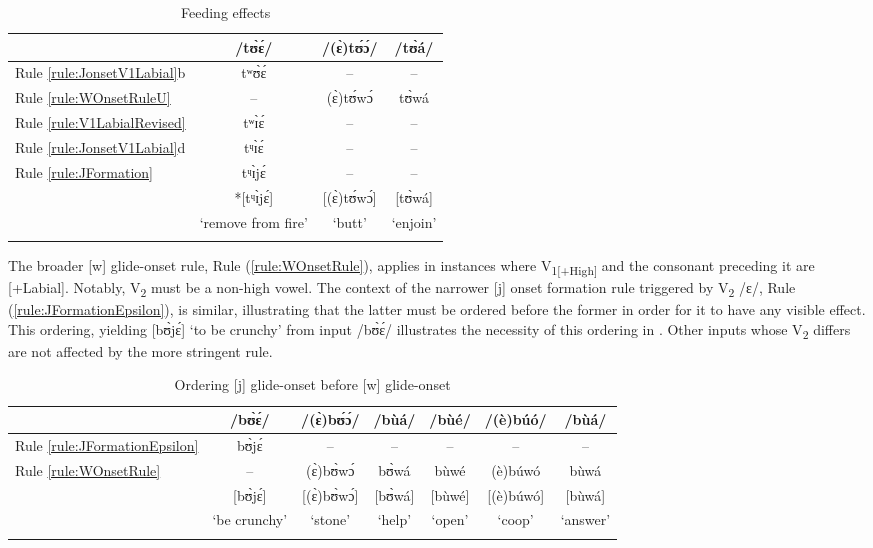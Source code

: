 \documentclass[output=paper,colorlinks,citecolor=brown]{langscibook}
\begin{document}
\begin{table}
\caption{Feeding effects}
\label{tab:Ordering4}
 \begin{tabular}{lccc}
  \lsptoprule
   & /tʊ̀ɛ́/	&/(ɛ̀)tʊ́ɔ́/&	/tʊ̀á/	\\
   \midrule
   Rule \ref{rule:JonsetV1Labial}b & tʷʊ̀ɛ́ & -- & -- \\
   Rule \ref{rule:WOnsetRuleU} & -- & (ɛ̀)tʊ́wɔ́ & tʊ̀wá\\
    Rule \ref{rule:V1LabialRevised} & tʷɪ̀ɛ́ & -- & -- \\
    Rule \ref{rule:JonsetV1Labial}d & tᶣɪ̀ɛ́ & -- &  -- \\
    Rule \ref{rule:JFormation} & tᶣɪ̀jɛ́ & -- & -- \\
    \midrule
   & *[tᶣɪ̀jɛ́] & [(ɛ̀)tʊ́wɔ́] & [tʊ̀wá] \\
   & `remove from fire' & `butt' & `enjoin' \\
  \lspbottomrule
 \end{tabular}
 \end{table}

The broader [w] glide-onset rule, Rule (\ref{rule:WOnsetRule}), applies in instances where V\textsubscript{1[+High]} and the consonant preceding it are [+Labial]. Notably, V\textsubscript{2} must be a non-high vowel. The context of the narrower [j] onset formation rule triggered by V\textsubscript{2} /ɛ/, Rule (\ref{rule:JFormationEpsilon}), is similar, illustrating that the latter must be ordered before the former in order for it to have any visible effect. This  ordering, yielding [bʊ̀jɛ́] `to be crunchy' from input /bʊ̀ɛ́/ illustrates the necessity of this ordering in . Other inputs whose V\textsubscript{2} differs are not affected by the more stringent rule.

\begin{table}
\caption{Ordering [j] glide-onset before [w] glide-onset}
\label{tab:Ordering5}
\small
 \begin{tabular}{lcccccc}
  \lsptoprule
 & /bʊ̀ɛ́/ & /(ɛ̀)bʊ́ɔ́/ & /bùá/ & /bùé/ & /(è)búó/ & /bùá/	\\
 \midrule
  Rule \ref{rule:JFormationEpsilon} & bʊ̀jɛ́ & -- & -- & -- & -- & --  \\ 
 Rule \ref{rule:WOnsetRule} & -- & (ɛ̀)bʊ̀wɔ́ & bʊ̀wá& bùwé & (è)búwó & bùwá \\
 \midrule
   & [bʊ̀jɛ́] & [(ɛ̀)bʊ̀wɔ́] & [bʊ̀wá]& [bùwé] & [(è)búwó] & [bùwá] \\
   & `be crunchy' & `stone' & `help' & `open' & `coop' & `answer' \\
  \lspbottomrule
 \end{tabular}
 \end{table}
\end{document}
